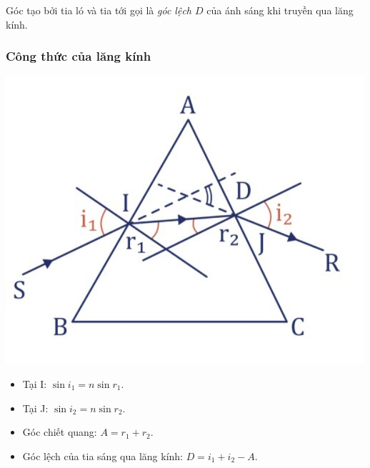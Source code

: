 Góc tạo bởi tia ló và tia tới gọi là \textit{góc lệch $D$} của ánh sáng khi truyền qua lăng kính.
\subsubsection{Công thức của lăng kính}
\begin{center}
	\includegraphics[scale=0.45]{../figs/VN12-PH-32-L-019-1-2.jpg}
\end{center}
\begin{itemize}
	\item Tại I: $\sin i_1=n\sin r_1$.
	\item Tại J: $\sin i_2=n\sin r_2$.
	\item Góc chiết quang: $A=r_1+r_2$.
	\item Góc lệch của tia sáng qua lăng kính: $D=i_1+i_2-A$.
\end{itemize}


